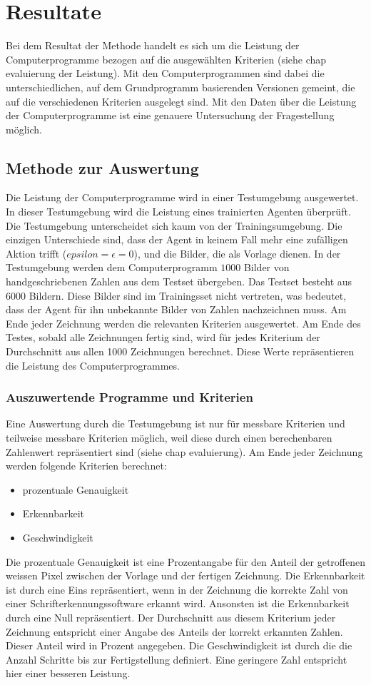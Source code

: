 \chapter{Resultate}
Bei dem Resultat der Methode handelt es sich um die Leistung der
Computerprogramme bezogen auf die ausgewählten Kriterien (siehe chap evaluierung  %
der Leistung). Mit den Computerprogrammen sind dabei die unterschiedlichen, auf
dem Grundprogramm basierenden Versionen gemeint, die auf die verschiedenen
Kriterien ausgelegt sind. Mit den Daten über die Leistung der Computerprogramme
ist eine genauere Untersuchung der Fragestellung möglich.

\section{Methode zur Auswertung}
Die Leistung der Computerprogramme wird in einer Testumgebung ausgewertet. In
dieser Testumgebung wird die Leistung eines trainierten Agenten überprüft. Die
Testumgebung unterscheidet sich kaum von der Trainingsumgebung. Die einzigen
Unterschiede sind, dass der Agent in keinem Fall mehr eine zufälligen Aktion
trifft ($epsilon = \epsilon = 0$), und die Bilder, die als Vorlage dienen. In
der Testumgebung werden dem Computerprogramm $1000$ Bilder von handgeschriebenen
Zahlen aus dem Testset übergeben. Das Testset besteht aus $6000$ Bildern. Diese
Bilder sind im Trainingsset nicht vertreten, was bedeutet, dass der Agent für
ihn unbekannte Bilder von Zahlen nachzeichnen muss. Am Ende jeder Zeichnung
werden die relevanten Kriterien ausgewertet. Am Ende des Testes, sobald alle
Zeichnungen fertig sind, wird für jedes Kriterium der Durchschnitt aus allen
1000 Zeichnungen berechnet. Diese Werte repräsentieren die Leistung des
Computerprogrammes.

\subsection*{Auszuwertende Programme und Kriterien}
Eine Auswertung durch die Testumgebung ist nur für messbare Kriterien und
teilweise messbare Kriterien möglich, weil diese durch einen berechenbaren
Zahlenwert repräsentiert sind (siehe chap evaluierung). Am Ende jeder Zeichnung  %
werden folgende Kriterien berechnet:
\begin{itemize}
    \item prozentuale Genauigkeit
    \item Erkennbarkeit
    \item Geschwindigkeit
\end{itemize}
Die prozentuale Genauigkeit ist eine Prozentangabe für den Anteil der
getroffenen weissen Pixel zwischen der Vorlage und der fertigen Zeichnung. Die
Erkennbarkeit ist durch eine Eins repräsentiert, wenn in der Zeichnung die
korrekte Zahl von einer Schrifterkennungssoftware erkannt wird. Ansonsten ist
die Erkennbarkeit durch eine Null repräsentiert. Der Durchschnitt aus diesem
Kriterium jeder Zeichnung entspricht einer Angabe des Anteils der korrekt
erkannten Zahlen. Dieser Anteil wird in Prozent angegeben. Die Geschwindigkeit
ist durch die die Anzahl Schritte bis zur Fertigstellung definiert. Eine
geringere Zahl entspricht hier einer besseren Leistung.

